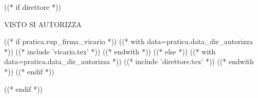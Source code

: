 ((* if direttore *))
\vspace{8mm}

\begin{minipage}{\linewidth}
\begin{center}
	VISTO SI AUTORIZZA
\end{center}
\vspace{8mm}

((* if pratica.rup_firma_vicario *))
((* with data=pratica.data_dir_autorizza *))
((* include 'vicario.tex' *))
((* endwith *))
((* else *))
((* with data=pratica.data_dir_autorizza *))
((* include 'direttore.tex' *))
((* endwith *))
((* endif *))
\end{minipage}
((* endif *))


